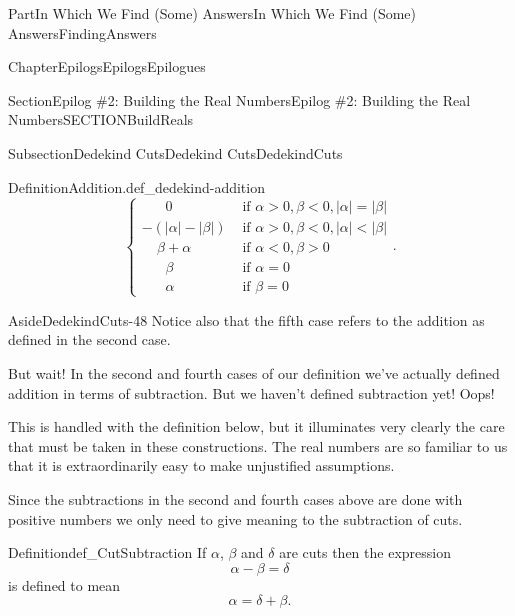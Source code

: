 \documentclass[oneside,10pt,]{book}
\numberwithin{equation}{part}
\newcommand{\abs}[1]{\left|#1\right|}
\newcommand{\lt}{<}
\newcommand{\amp}{&}
\begin{document}
\begin{partptx}{Part}{In Which We Find (Some) Answers}{}{In Which We Find (Some) Answers}{}{}{FindingAnswers}
\begin{chapterptx}{Chapter}{Epilogs}{}{Epilogs}{}{}{Epilogues}
\begin{sectionptx}{Section}{Epilog \#2: Building the Real Numbers}{}{Epilog \#2: Building the Real Numbers}{}{}{SECTIONBuildReals}
\begin{subsectionptx}{Subsection}{Dedekind Cuts}{}{Dedekind Cuts}{}{}{DedekindCuts}
\begin{definition}{Definition}{Addition.}{def_dedekind-addition}
\begin{equation*}
\begin{cases}
\ \ \ \ \ \ \ \,0             \amp  \text{ if \(\alpha>0, \beta\lt 0, \abs{\alpha}=\abs{\beta} \)} \\
-(\abs{\alpha}-\abs{\beta})   \amp  \text{ if \(\alpha>0, \beta\lt 0, \abs{\alpha}\lt \abs{\beta} \)} \\
\ \ \ \ \ \beta+\alpha        \amp  \text{ if \(\alpha\lt 0, \beta>0 \) } \\
\ \ \ \ \ \ \ \,\beta{}       \amp  \text{ if \(\alpha=0 \) } \\
\ \ \ \ \ \ \ \,\alpha        \amp  \text{ if \(\beta=0 \) }
\end{cases}\text{.}
\end{equation*}
%
\end{definition}
\begin{aside}{Aside}{}{DedekindCuts-48}%
Notice also that the fifth case refers to the addition as defined in the second case.%
\end{aside}
But wait!  In the second and fourth cases of our definition we've actually defined addition in terms of subtraction. But we haven't defined subtraction yet!  Oops!%
\par
This is handled with the definition below, but it illuminates very clearly the care that must be taken in these constructions.  The real numbers are so familiar to us that it is extraordinarily easy to make unjustified assumptions.%
\par
Since the subtractions in the second and fourth cases above are done with positive numbers we only need to give meaning to the subtraction of cuts.%
\begin{definition}{Definition}{}{def_CutSubtraction}%
%
%
If \(\alpha\), \(\beta\) and \(\delta\) are cuts then the expression%
\begin{equation*}
\alpha-\beta=\delta
\end{equation*}
is defined to mean%
\begin{equation*}
\alpha=\delta+\beta\text{.}
\end{equation*}
%
\end{definition}

\end{subsectionptx}
\end{sectionptx}
\end{chapterptx}
\end{partptx}
\end{document}
